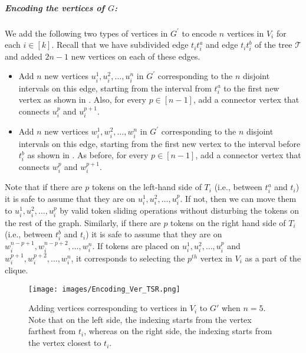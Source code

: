 \subparagraph*{Encoding the vertices of $G$:}
We add the following two types of vertices in $G^{\prime}$
to encode $n$ vertices in $V_i$ for each $i \in [k]$.
Recall that we have subdivided edge $t_it_i^a$ and edge $t_it_i^b$
of the tree $\mathcal{T}$ and added $2n-1$ new vertices
on each of these edges.
\begin{itemize}
\item Add $n$ new vertices $u_i^1,u_i^2,\ldots,u_i^n$
in $G^\prime$ corresponding to the $n$ disjoint intervals
on this edge, starting from the interval from $t_i^a$
to the first new vertex as shown in .
Also, for every $p \in [n-1]$, add a connector vertex that connects
$u_i^p$ and $u_i^{p+1}$.
\item  Add $n$ new vertices $w_i^1,w_i^2,\ldots,w_i^n$
in $G^\prime$ corresponding to the $n$ disjoint intervals
on this edge, starting from the first new vertex to the interval
before $t_i^b$ as shown in .
As before, for every $p \in [n-1]$, add a connector vertex
that connects $w_i^p$ and $w_i^{p+1}$.
\end{itemize}
Note that if there are $p$ tokens on the left-hand side of $T_i$
(i.e., between $t_i^a$ and $t_i$) it is safe to assume that they are on
$u_i^1,u_i^2,\ldots,u_i^p$. If not, then we can move them to
$u_i^1,u_i^2,\ldots,u_i^p$ by valid token sliding operations
without disturbing the tokens on the rest of the graph.
Similarly, if there are $p$ tokens on the right hand side of $T_i$
(i.e., between $t_i^b$ and $t_i$) it is safe to assume that
they are on $w_i^{n-p+1},w_i^{n-p+2},\ldots,w_i^n$.
If tokens are placed on $u_i^1,u_i^2,\ldots,u_i^p$ and
$w_i^{p+1},w_i^{p+2},\ldots,w_i^n$, it corresponds to
selecting the $p^{th}$ vertex in $V_i$ as a part of the clique.

\begin{figure}[t]
\centering
\texttt{[image: images/Encoding\_Ver\_TSR.png]}
\caption{Adding vertices corresponding to vertices in $V_i$ to $G'$ when
$n = 5$. Note that on the left side, the indexing starts from the
vertex farthest from $t_i$, whereas on the right side, the indexing
starts from the vertex closest to $t_i$. \label{fig:Encoding_Ver_TSR}
\vspace{-5mm}}
\end{figure}


